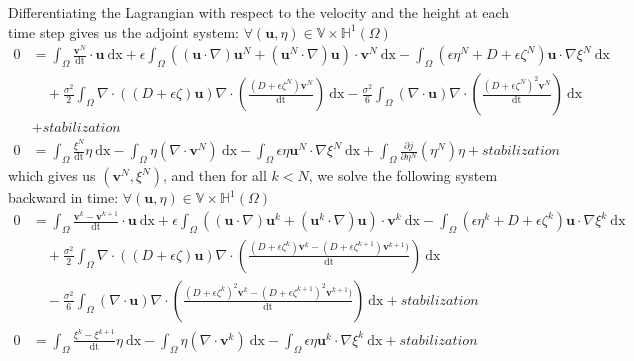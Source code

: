 \documentclass[11pt,a4paper]{article}
\begin{document}
		Differentiating the Lagrangian with respect to the velocity and the height at each time step gives us the adjoint system: $\forall (\mathbf{u},\eta) \in \mathbb{V} \times \mathbb{H}^1(\Omega)$		
		\begin{equation}
			\begin{split}
				0 & = \int_{\Omega} \! \frac{\mathbf{v}^{N}}{\mathrm{dt}} \cdot	\mathbf{u} \: \mathrm{dx} + \epsilon \int_{\Omega} \! ((\mathbf{u} \cdot \nabla )\mathbf{u}^N + (\mathbf{u}^N \cdot \nabla )\mathbf{u}) \cdot 	\mathbf{v}^{N} \: \mathrm{dx} 	- \int_{\Omega} \! (\epsilon \eta^N + D + \epsilon \zeta^N) \mathbf{u} \cdot \nabla \xi^N \: \mathrm{dx} \\
				&\quad + \frac{\sigma^2}{2} \int_{\Omega} \! \nabla \cdot ((D + \epsilon \zeta) \mathbf{u})  \nabla \cdot \left(\frac{(D+ \epsilon \zeta^N)\mathbf{v}^N}{\mathrm{dt}}\right) \: \mathrm{dx} - \frac{\sigma^2}{6} \int_{\Omega} \! (\nabla \cdot \mathbf{u})  \nabla \cdot \left(\frac{(D+ \epsilon \zeta^N)^2 \mathbf{v}^N}{\mathrm{dt}}\right) \: \mathrm{dx} \\
				& + stabilization \\
				0 & = \int_{\Omega} \! \frac{\xi^{N}}{\mathrm{dt}} \eta \: \mathrm{dx} - \int_{\Omega} \! \eta (\nabla \cdot \mathbf{v}^N) \: \mathrm{dx} - \int_{\Omega} \! \epsilon \eta \mathbf{u}^N \cdot \nabla \xi^N \: \mathrm{dx} + \int_{\Omega} \! \frac{\partial j}{\partial \eta^N}(\eta^N) \eta + stabilization
			\end{split}			
		\end{equation}
		which gives us $(\mathbf{v}^N, \xi^N)$, and then for all $k<N$, we solve the following system backward in time: $\forall (\mathbf{u},\eta) \in \mathbb{V} \times \mathbb{H}^1(\Omega)$ 
		\begin{equation}
			\begin{split}
				0 & = \int_{\Omega} \! \frac{\mathbf{v}^{k} - \mathbf{v}^{k+1}}{\mathrm{dt}} \cdot	\mathbf{u} \: \mathrm{dx} + \epsilon \int_{\Omega} \! ((\mathbf{u} \cdot \nabla )\mathbf{u}^k + (\mathbf{u}^k \cdot \nabla )\mathbf{u}) \cdot 	\mathbf{v}^{k} \: \mathrm{dx} 	- \int_{\Omega} \! (\epsilon \eta^k + D + \epsilon \zeta^k) \mathbf{u} \cdot \nabla \xi^k \: \mathrm{dx} \\
				&\quad + \frac{\sigma^2}{2} \int_{\Omega} \! \nabla \cdot ((D + \epsilon \zeta) \mathbf{u})  \nabla \cdot \left(\frac{(D+ \epsilon \zeta^k)\mathbf{v}^k - (D + \epsilon \zeta^{k+1})\mathbf{v}^{k+1})}{\mathrm{dt}}\right) \: \mathrm{dx} \\
				&\quad - \frac{\sigma^2}{6} \int_{\Omega} \! (\nabla \cdot \mathbf{u})  \nabla \cdot \left(\frac{(D+ \epsilon \zeta^k)^2 \mathbf{v}^k - (D + \epsilon \zeta^{k+1})^2 \mathbf{v}^{k+1})}{\mathrm{dt}}\right) \: \mathrm{dx} + stabilization \\
				0 & = \int_{\Omega} \! \frac{\xi^{k} - \xi^{k+1}}{\mathrm{dt}} \eta \: \mathrm{dx} - \int_{\Omega} \! \eta (\nabla \cdot \mathbf{v}^k) \: \mathrm{dx} - \int_{\Omega} \! \epsilon \eta \mathbf{u}^k \cdot \nabla \xi^k \: \mathrm{dx} + stabilization
			\end{split}			
		\end{equation}
\end{document}

